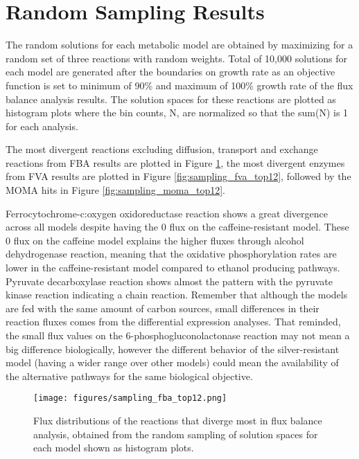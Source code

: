 \section{Random Sampling Results}

The random solutions for each metabolic model are obtained by maximizing for a random set of three reactions with random weights. Total of 10,000 solutions for each model are generated after the boundaries on growth rate as an objective function is set to minimum of 90\% and maximum of 100\% growth rate of the flux balance analysis results. The solution spaces for these reactions are plotted as histogram plots where the bin counts, N, are normalized so that the sum(N) is 1 for each analysis.

The most divergent reactions excluding diffusion, transport and exchange reactions from FBA results are plotted in Figure \ref{fig:sampling_fba_top12}, the most divergent enzymes from FVA results are plotted in Figure \ref{fig:sampling_fva_top12}, followed by the MOMA hits in Figure \ref{fig:sampling_moma_top12}.


Ferrocytochrome-c:oxygen oxidoreductase reaction shows a great divergence across all models despite having the 0 flux on the caffeine-resistant model. These 0 flux on the caffeine model explains the higher fluxes through alcohol dehydrogenase reaction, meaning that the oxidative phosphorylation rates are lower in the caffeine-resistant model compared to ethanol producing pathways. Pyruvate decarboxylase reaction shows almost the pattern with the pyruvate kinase reaction indicating a chain reaction. Remember that although the models are fed with the same amount of carbon sources, small differences in their reaction fluxes comes from the differential expression analyses. That reminded, the small flux values on the 6-phosphogluconolactonase reaction may not mean a big difference biologically, however the different behavior of the silver-resistant model (having a wider range over other models) could mean the availability of the alternative pathways for the same biological objective.

\begin{figure}[H]
  \begin{center}
  \texttt{[image: figures/sampling\_fba\_top12.png]}
  \caption[Flux distributions of the reactions that diverge most in flux balance analysis, obtained from the random sampling of solution spaces for each model shown as histogram plots]{Flux distributions of the reactions that diverge most in flux balance analysis, obtained from the random sampling of solution spaces for each model shown as histogram plots.}
  \label{fig:sampling_fba_top12}
  \end{center}
\end{figure}

